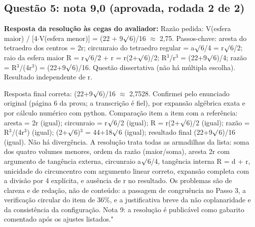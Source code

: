\documentclass{article}%
\begin{document}
\subsection*{Questão 5: nota 9,0 (aprovada, rodada 2 de 2)}%
\textbf{Resposta da resolução às cegas do avaliador:} Razão pedida: V(esfera maior) / {[}4$\cdot$V(esfera menor){]} = (22 + 9$\surd$6)/16 $\approx$ 2,75.\newline%
\newline%
Passos{-}chave: aresta do tetraedro dos centros = 2r; circunraio do tetraedro regular = a$\surd$6/4 = r$\surd$6/2; raio da esfera maior R = r$\surd$6/2 + r = r(2+$\surd$6)/2; R$^3$/r$^3$ = (22+9$\surd$6)/4; razão = R$^3$/(4r$^3$) = (22+9$\surd$6)/16.\newline%
\newline%
Questão dissertativa (não há múltipla escolha). Resultado independente de r.\par %
Resposta final correta: (22+9$\surd$6)/16 $\approx$ 2,7528. Confirmei pelo enunciado original (página 6 da prova; a transcrição é fiel), por expansão algébrica exata e por cálculo numérico com python. Comparação item a item com a referência: aresta = 2r (igual); circunraio = r$\surd$6/2 (igual); R = r(2+$\surd$6)/2 (igual); razão = R$^3$/(4r$^3$) (igual); (2+$\surd$6)$^3$ = 44+18$\surd$6 (igual); resultado final (22+9$\surd$6)/16 (igual). Não há divergência. A resolução trata todas as armadilhas da lista: soma dos quatro volumes menores, ordem da razão (maior/soma), aresta 2r com argumento de tangência externa, circunraio a$\surd$6/4, tangência interna R = d + r, unicidade do circuncentro com argumento linear correto, expansão completa com a divisão por 4 explícita, e ausência de r no resultado. Os problemas são de clareza e de redação, não de conteúdo: a passagem de congruência no Passo 3, a verificação circular do item de 36\%, e a justificativa breve da não coplanaridade e da consistência da configuração. Nota 9: a resolução é publicável como gabarito comentado após os ajustes listados."%
\end{document}
